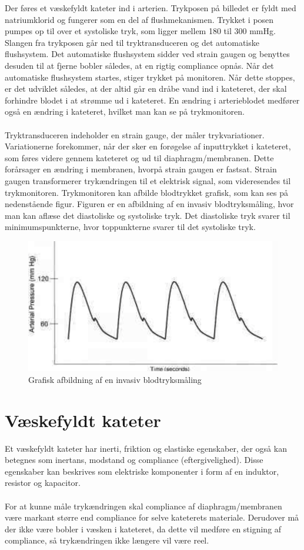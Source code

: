 Der føres et væskefyldt kateter ind i arterien. Trykposen på billedet er fyldt med natriumklorid og fungerer som en del af flushmekanismen. Trykket i posen pumpes op til over et systoliske tryk, som ligger mellem 180 til 300 mmHg. Slangen fra trykposen går ned til tryktransduceren og det automatiske flushsystem. Det automatiske flushsystem sidder ved strain gaugen og benyttes desuden til at fjerne bobler således, at en rigtig compliance opnås.  Når det automatiske flushsystem startes, stiger trykket på monitoren. Når dette stoppes, er det udviklet således, at der altid går en dråbe vand ind i kateteret, der skal forhindre blodet i at strømme ud i kateteret. En ændring i arterieblodet medfører også en ændring i kateteret, hvilket man kan se på trykmonitoren. \\\\
Tryktransduceren indeholder en strain gauge, der måler trykvariationer. Variationerne forekommer, når der sker en forøgelse af inputtrykket i kateteret, som føres videre gennem kateteret og ud til diaphragm/membranen. Dette forårsager en ændring i membranen, hvorpå strain gaugen er fastsat. Strain gaugen transformerer trykændringen til et elektrisk signal, som videresendes til trykmonitoren. Trykmonitoren kan afbilde blodtrykket grafisk, som kan ses på nedenstående figur. Figuren er en afbildning af en invasiv blodtryksmåling, hvor man kan aflæse det diastoliske og systoliske tryk. Det diastoliske tryk svarer til minimumspunkterne, hvor toppunkterne svarer til det systoliske tryk. 

\begin{figure}[H]
	\centering
	\includegraphics[width=1\textwidth]{Figurer/Snip20151207_51}
	\caption{Grafisk afbildning af en invasiv blodtryksmåling}
\end{figure}

\section{Væskefyldt kateter}
Et væskefyldt kateter har inerti, friktion og elastiske egenskaber, der også kan betegnes som inertans, modstand og compliance (eftergivelighed). Disse egenskaber kan beskrives som elektriske komponenter i form af en induktor, resistor og kapacitor. 
\\ \\
For at kunne måle trykændringen skal compliance af diaphragm/membranen være markant større end compliance for selve kateterets materiale. Derudover må der ikke være bobler i væsken i kateteret, da dette vil medføre en stigning af compliance, så trykændringen ikke længere vil være reel. 

